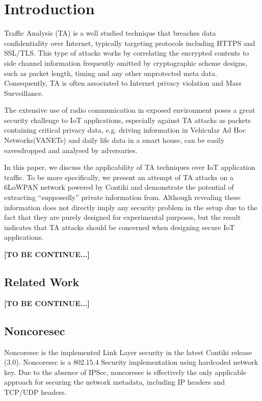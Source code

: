 \section{Introduction}
Traffic Analysis (TA) is a well studied technique that breaches data confidentiality over Internet, typically targeting protocols including HTTPS\cite{rfc2818} and SSL\cite{rfc6101}/TLS\cite{rfc5246}. This type of attacks works by correlating the encrypted contents to side channel information frequently omitted by cryptographic scheme designs, such as packet length, timing and any other unprotected meta data. Consequently, TA is often associated to Internet privacy violation and Mass Surveillance.

The extensive use of radio communication in exposed environment poses a great security challenge to IoT applications, especially against TA attacks as packets containing critical privacy data, e.g. driving information in Vehicular Ad Hoc Networks(VANETs)\cite{VANET} and daily life data in a smart house, can be easily eavesdropped and analysed by adversaries.

In this paper, we discuss the applicability of TA techniques over IoT application traffic. To be more specifically, we present an attempt of TA attacks on a 6LoWPAN\cite{rfc4944} network powered by Contiki\cite{Contiki} and demonstrate the potential of extracting ``supposedly'' private information from. Although revealing these information does not directly imply any security problem in the setup due to the fact that they are purely designed for experimental purposes, but the result indicates that TA attacks should be concerned when designing secure IoT applications.

\textbf{[TO BE CONTINUE...]}

\subsection{Related Work}
\textbf{[TO BE CONTINUE...]}

\subsection{Noncoresec}
Noncoresec\cite{noncoresec} is the implemented Link Layer\cite{OSI} security in the latest Contiki release (3.0). Noncoresec is a 802.15.4 Security\cite{802154} implementation using hardcoded network key. Due to the absence of IPSec\cite{rfc4301}, noncoresec is effectively the only applicable approach for securing the network metadata, including IP headers and TCP/UDP headers.

